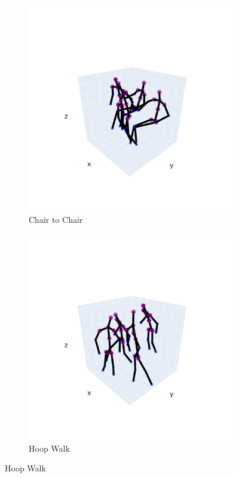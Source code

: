         \begin{figure}[h]
            \begin{subfigure}{.5\textwidth}
                \centering
                \includegraphics[width=.9\linewidth]{../src/resources/mov-plots/mov-0.png}
                \caption{Chair to Chair}
                \label{fig:mov-0}
            \end{subfigure}
            \begin{subfigure}{.5\textwidth}
                \centering
                \includegraphics[width=.9\linewidth]{../src/resources/mov-plots/mov-1.png}
                \caption{Hoop Walk}
                \label{fig:mov-1}
            \end{subfigure}
            

\end{figure}
